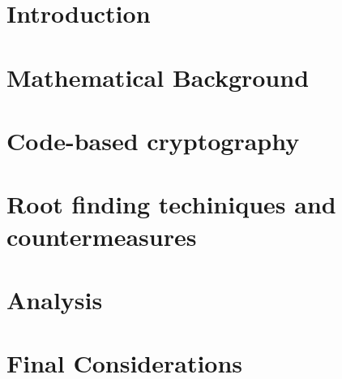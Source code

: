 \documentclass[brazil, english]{ufsc-thesis}
\begin{document}


\textual%

\chapter{Introduction}
\label{ch:intro}


\chapter{Mathematical Background}
\label{ch:math}


\chapter{Code-based cryptography}
\label{ch:code-based}


\chapter{Root finding techiniques and countermeasures}
\label{ch:roots}


\chapter{Analysis}
\label{ch:analysis}


\chapter{Final Considerations}
\label{ch:final}


\postextual

\end{document}
